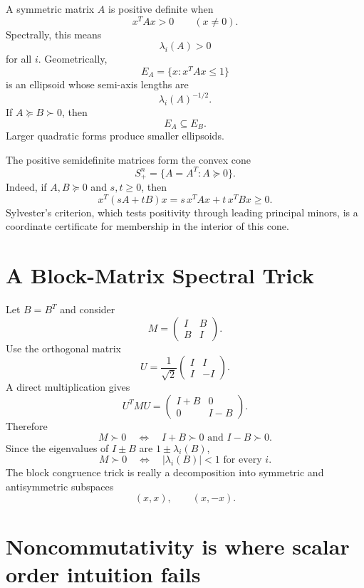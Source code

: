 A symmetric matrix \(A\) is positive definite when
\[
  x^TAx>0
  \qquad(x\ne0).
\]
Spectrally, this means
\[
  \lambda_i(A)>0
\]
for all \(i\).  Geometrically,
\[
  E_A=\{x:x^TAx\le1\}
\]
is an ellipsoid whose semi-axis lengths are
\[
  \lambda_i(A)^{-1/2}.
\]
If \(A\succeq B\succ0\), then
\[
  E_A\subseteq E_B.
\]
Larger quadratic forms produce smaller ellipsoids.

The positive semidefinite matrices form the convex cone
\[
  S_+^n=\{A=A^T:A\succeq0\}.
\]
Indeed, if \(A,B\succeq0\) and \(s,t\ge0\), then
\[
  x^T(sA+tB)x
  =s\,x^TAx+t\,x^TBx\ge0.
\]
Sylvester's criterion, which tests positivity through leading principal minors, is a coordinate certificate for membership in the interior of this cone.

\section{A Block-Matrix Spectral Trick}

Let \(B=B^T\) and consider
\[
  M=
  \begin{pmatrix}
    I&B\\
    B&I
  \end{pmatrix}.
\]
Use the orthogonal matrix
\[
  U=\frac1{\sqrt2}
  \begin{pmatrix}
    I&I\\
    I&-I
  \end{pmatrix}.
\]
A direct multiplication gives
\[
  U^TMU
  =
  \begin{pmatrix}
    I+B&0\\
    0&I-B
  \end{pmatrix}.
\]
Therefore
\[
  M\succ0
  \quad\Longleftrightarrow\quad
  I+B\succ0
  \text{ and }
  I-B\succ0.
\]
Since the eigenvalues of \(I\pm B\) are \(1\pm\lambda_i(B)\),
\[
  \boxed{
  M\succ0
  \quad\Longleftrightarrow\quad
  |\lambda_i(B)|<1
  \text{ for every }i.}
\]
The block congruence trick is really a decomposition into symmetric and antisymmetric subspaces
\[
  (x,x),
  \qquad
  (x,-x).
\]

\section{Noncommutativity is where scalar order intuition fails}

